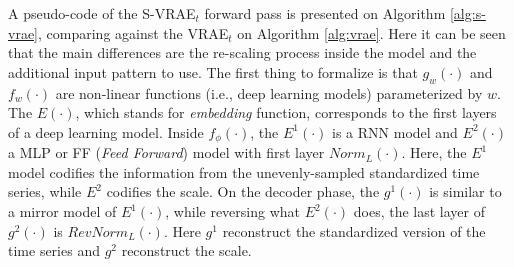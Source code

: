 A pseudo-code of the S-VRAE$_t$ forward pass is presented on Algorithm \ref{alg:s-vrae}, comparing against the VRAE$_t$ on Algorithm \ref{alg:vrae}. Here it can be seen that the main differences are the re-scaling process inside the model and the additional input pattern to use. The first thing to formalize is that $g_w(\cdot)$ and $f_w(\cdot)$ are non-linear functions (i.e., deep learning models) parameterized by $w$. The $E(\cdot)$, which stands for \textit{embedding} function, corresponds to the first layers of a deep learning model. Inside $f_{\phi}(\cdot)$, the $E^1(\cdot)$ is a RNN model and $E^2(\cdot)$ a MLP or FF (\textit{Feed Forward}) model with first layer $Norm_L(\cdot)$. Here, the $E^1$ model codifies the information from the unevenly-sampled standardized time series, while $E^2$ codifies the scale. 
On the decoder phase, the $g^1(\cdot)$ is similar to a mirror model of $E^1(\cdot)$, while reversing what $E^2(\cdot)$ does, the last layer of $g^2(\cdot)$ is $RevNorm_L(\cdot)$.
Here $g^1$ reconstruct the standardized version of the time series and $g^2$ reconstruct the scale. 



